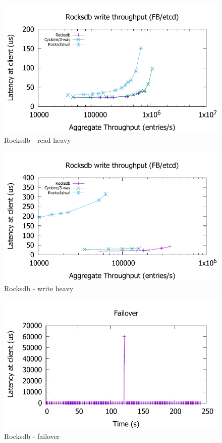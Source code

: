 \documentclass[twocolumn]{article}
\begin{document}
\begin{figure}
\includegraphics[scale=0.6]{results2/fb.pdf}
\caption{Rocksdb - read heavy}
\label{fig:fb}
\end{figure}
\begin{figure}
  \includegraphics[scale=0.6]{results2/fb2.pdf}
  \caption{Rocksdb - write heavy}
  \label{fig:fb2}
\end{figure}
\begin{figure}
  \includegraphics[scale=0.6]{results2/failover.pdf}
  \caption{Rocksdb - failover}
  \label{fig:timeline}
\end{figure}
\end{document}
